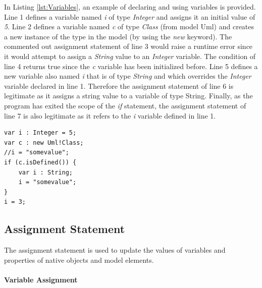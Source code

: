 In Listing \ref{lst:Variables}, an example of declaring and using variables is provided. Line 1 defines a variable named \emph{i} of type \emph{Integer} and assigns it an initial value of \emph{5}. Line 2 defines a variable named \emph{c} of type \emph{Class} (from model Uml) and creates a new instance of the type in the model (by using the \emph{new} keyword). The commented out assignment statement of line 3 would raise a runtime error since it would attempt to assign a \emph{String} value to an \emph{Integer} variable. The condition of line 4 returns true since the \emph{c} variable has been initialized before. Line 5 defines a new variable also named \emph{i} that is of type \emph{String} and which overrides the \emph{Integer} variable declared in line 1. Therefore the assignment statement of line 6 is legitimate as it assigns a string value to a variable of type String. Finally, as the program has exited the scope of the \emph{if} statement, the assignment statement of line 7 is also legitimate as it refers to the \emph{i} variable defined in line 1.

\begin{lstlisting}[basicstyle=\ttfamily\footnotesize, flexiblecolumns=true, numbers=none, nolol=true, caption=Example illustrating declaration and use of variables, label=lst:Variables, numbers=left, language=EOL, tabsize=2]
var i : Integer = 5;
var c : new Uml!Class;
//i = "somevalue";
if (c.isDefined()) {
	var i : String;
	i = "somevalue";
}
i = 3;
\end{lstlisting}

\subsection{Assignment Statement}

The assignment statement is used to update the values of variables and  properties of native objects and model elements.

\paragraph{Variable Assignment}

